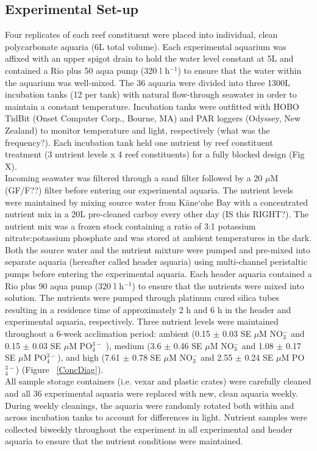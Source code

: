 \documentclass{article}%
\begin{document}
\subsection{Experimental Set-up}
Four replicates of each reef constituent were placed into individual, clean polycarbonate aquaria (6L total volume). Each experimental aquarium was affixed with an upper spigot drain to hold the water level constant at 5L and contained a Rio plus 50 aqua pump (320 l h$^{-1}$) to ensure that the water within the aquarium was well-mixed. The 36 aquaria were divided into three 1300L incubation tanks (12 per tank) with natural flow-through seawater in order to maintain a constant temperature. Incubation tanks were outfitted with HOBO TidBit (Onset Computer Corp., Bourne, MA) and PAR loggers (Odyssey, New Zealand) to monitor temperature and light, respectively (what was the frequency?). Each incubation tank held one nutrient by reef constituent treatment (3 nutrient levels x 4 reef constituents) for a fully blocked design (Fig X).  \\
\indent Incoming seawater was filtered through a sand filter followed by a 20 $\mu$M  (GF/F??) filter before entering our experimental aquaria. The nutrient levels were maintained by mixing source water from K\={a}ne`ohe Bay with a concentrated nutrient mix in a 20L pre-cleaned carboy every other day (IS this RIGHT?). The nutrient mix was a frozen stock containing a ratio of 3:1 potassium nitrate:potassium phosphate and was stored at ambient temperatures in the dark. Both the source water and the nutrient mixture were pumped and pre-mixed into separate aquaria (hereafter called header aquaria) using multi-channel peristaltic pumps before entering the experimental aquaria. Each header aquaria contained a  Rio plus 90 aqua pump (320 l h$^{-1}$) to ensure that the nutrients were mixed into solution. The nutrients were pumped through platinum cured silica tubes resulting in a residence time of approximately 2 h and 6 h in the header and experimental aquaria, respectively. Three nutrient levels were maintained throughout a 6-week acclimation period: ambient (0.15 $\pm$ 0.03 SE $\mu$M NO$_{3}^{-}$ and 0.15 $ \pm$ 0.03 SE $\mu$M PO$_{4}^{3-}$ ), medium (3.6 $\pm$ 0.46 SE $\mu$M NO$_{3}^{-}$ and 1.08  $\pm$ 0.17 SE $\mu$M PO$_{4}^{3-}$), and high (7.61 $\pm$ 0.78 SE $\mu$M NO$_{3}^{-}$ and 2.55 $\pm$ 0.24 SE  $\mu$M PO$_{4}^{3-}$) (Figure ~\ref{ConcDiag}).  \\
\indent All sample storage containers (i.e. vexar and plastic crates) were carefully cleaned and all 36 experimental aquaria were replaced with new, clean aquaria weekly. During weekly cleanings, the aquaria were randomly rotated both within and across incubation tanks to account for differences in light. Nutrient samples were collected biweekly throughout the experiment in all experimental and header aquaria to ensure that the nutrient conditions were maintained.
\end{document}
